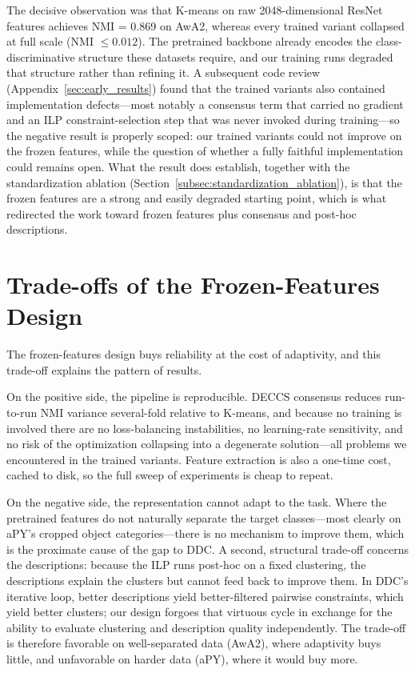 The decisive observation was that K-means on raw 2048-dimensional ResNet features achieves NMI = 0.869 on AwA2, whereas every trained variant collapsed at full scale (NMI $\leq 0.012$). The pretrained backbone already encodes the class-discriminative structure these datasets require, and our training runs degraded that structure rather than refining it. A subsequent code review (Appendix~\ref{sec:early_results}) found that the trained variants also contained implementation defects---most notably a consensus term that carried no gradient and an ILP constraint-selection step that was never invoked during training---so the negative result is properly scoped: our trained variants could not improve on the frozen features, while the question of whether a fully faithful implementation could remains open. What the result does establish, together with the standardization ablation (Section~\ref{subsec:standardization_ablation}), is that the frozen features are a strong and easily degraded starting point, which is what redirected the work toward frozen features plus consensus and post-hoc descriptions.

\section{Trade-offs of the Frozen-Features Design}
\label{sec:tradeoffs}

The frozen-features design buys reliability at the cost of adaptivity, and this trade-off explains the pattern of results.

On the positive side, the pipeline is reproducible. DECCS consensus reduces run-to-run NMI variance several-fold relative to K-means, and because no training is involved there are no loss-balancing instabilities, no learning-rate sensitivity, and no risk of the optimization collapsing into a degenerate solution---all problems we encountered in the trained variants. Feature extraction is also a one-time cost, cached to disk, so the full sweep of experiments is cheap to repeat.

On the negative side, the representation cannot adapt to the task. Where the pretrained features do not naturally separate the target classes---most clearly on aPY's cropped object categories---there is no mechanism to improve them, which is the proximate cause of the gap to DDC. A second, structural trade-off concerns the descriptions: because the ILP runs post-hoc on a fixed clustering, the descriptions explain the clusters but cannot feed back to improve them. In DDC's iterative loop, better descriptions yield better-filtered pairwise constraints, which yield better clusters; our design forgoes that virtuous cycle in exchange for the ability to evaluate clustering and description quality independently. The trade-off is therefore favorable on well-separated data (AwA2), where adaptivity buys little, and unfavorable on harder data (aPY), where it would buy more.

